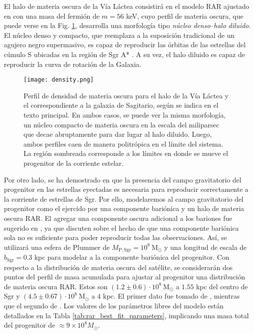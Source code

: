 \documentclass[baaa]{baaa}
\begin{document}
El halo de materia oscura de la Vía Láctea consistirá en el modelo RAR ajustado en \cite{BecerraVergara2020, BecerraVergara2021} con una masa del fermión de $m= 56$ keV, cuyo perfil de materia oscura, que puede verse en la Fig. \ref{fig:density_profiles}, desarrolla una morfología tipo \textit{núcleo denso}--\textit{halo diluido}. El núcleo denso y compacto, que reemplaza a la suposición tradicional de un agujero negro supermasivo, es capaz de reproducir las órbitas de las estrellas del cúmulo S ubicadas en la región de Sgr A* \cite{BecerraVergara2021}. A su vez, el halo diluido es capaz de reproducir la curva de rotación de la Galaxia.

\begin{figure}
    \centering
    \texttt{[image: density.png]}
    \caption{Perfil de densidad de materia oscura para el halo de la Vía Láctea y el correspondiente a la galaxia de Sagitario, según se indica en el texto principal. En ambos casos, se puede ver la misma morfología, un núcleo compacto de materia oscura en la escala del miliparsec que decae abruptamente para dar lugar al halo diluido. Luego, ambos perfiles caen de manera politrópica en el límite del sistema. La región sombreada corresponde a los límites en donde se mueve el progenitor de la corriente estelar.}
    \label{fig:density_profiles}
\end{figure}

Por otro lado, se ha demostrado en \cite{Gibbons2014} que la presencia del campo gravitatorio del progenitor en las estrellas eyectadas es necesaria para reproducir correctamente a la corriente de estrellas de Sgr. Por ello, modelaremos al campo gravitatorio del progenitor como el ejercido por una componente bariónica y un halo de materia oscura RAR. El agregar una componente oscura adicional a los bariones fue sugerido en \cite{Vasiliev2020}, ya que discuten sobre el hecho de que una componente bariónica sola no es suficiente para poder reproducir todas las observaciones. Así, se utilizará una esfera de Plummer de $M_{\mathrm{P}, \mathrm{Sgr}} = 10^{8}\ \mathrm{M}_{\odot}$ y una longitud de escala de $b_{\mathrm{Sgr}} = 0.3$ kpc para modelar a la componente bariónica del progenitor. 
%
Con respecto a la distribución de materia oscura del satélite, se considerarán dos puntos del perfil de masa acumulada para ajustar al progenitor una distribución de materia oscura RAR. Estos son $(1.2\pm 0.6)\cdot 10^{8}\ \mathrm{M}_{\odot}$ a $1.55$ kpc del centro de Sgr y $(4.5 \pm 0.67) \cdot 10^{8}\mathrm\ \mathrm{M}_{\odot}$ a $4$ kpc. El primer dato fue tomado de \cite{Walker2009}, mientras que el segundo de \cite{Vasiliev2020}.
%
Los valores de los parámetros libres del modelo están detallados en la Tabla \ref{tab:rar_best_fit_parameters}, implicando una masa total del progenitor de $\approx 9\times10^8 M_\odot$.
\end{document}
